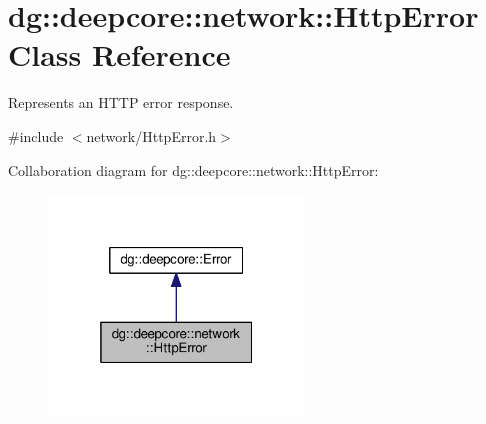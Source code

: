 \hypertarget{classdg_1_1deepcore_1_1network_1_1_http_error}{}\section{dg\+:\+:deepcore\+:\+:network\+:\+:Http\+Error Class Reference}
\label{classdg_1_1deepcore_1_1network_1_1_http_error}


Represents an H\+T\+TP error response.  




{\ttfamily \#include $<$network/\+Http\+Error.\+h$>$}



Collaboration diagram for dg\+:\+:deepcore\+:\+:network\+:\+:Http\+Error\+:
\nopagebreak
\begin{figure}[H]
\begin{center}
\leavevmode
\includegraphics[width=193pt]{classdg_1_1deepcore_1_1network_1_1_http_error__coll__graph}
\end{center}
\end{figure}
